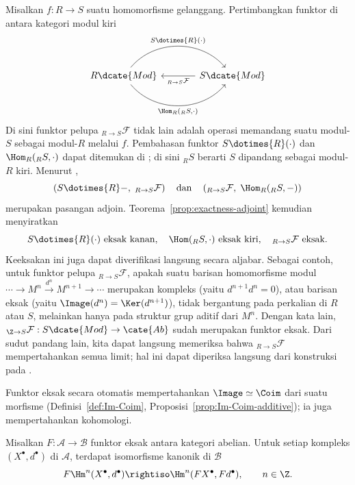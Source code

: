\begin{contoh}\label{eg:module-adjoint-pairs}
Misalkan $f:R\to S$ suatu homomorfisme gelanggang. Pertimbangkan funktor di
antara kategori modul kiri
\[\begin{tikzcd}[column sep=large]
	R\dcate{Mod} \arrow[bend left=50, r, "{S \dotimes{R} (\cdot)}"] \arrow[bend right=50, r, "{\Hom_R({}_R S, \cdot)}"'] & S\dcate{Mod} \arrow[l, "{ {}_{R \to S} \mathcal{F} }"]
\end{tikzcd}\]
Di sini funktor pelupa ${}_{R\to S}\mathcal{F}$ tidak lain adalah operasi
memandang suatu modul-$S$ sebagai modul-$R$ melalui $f$. Pembahasan funktor
$S\dotimes{R}(\cdot)$ dan $\Hom_R({}_R S,\cdot)$ dapat ditemukan di
\cite[\S 6.6]{Li1}; di sini ${}_R S$ berarti $S$ dipandang sebagai modul-$R$ kiri.
Menurut \cite[Korolari 6.6.8]{Li1},
\[\left(S\dotimes{R}-,\;{}_{R\to S}\mathcal{F}\right)
\quad\text{dan}\quad
\left({}_{R\to S}\mathcal{F},\;\Hom_R({}_R S,-)\right)\]
merupakan pasangan adjoin. Teorema~\ref{prop:exactness-adjoint} kemudian menyiratkan
\[S\dotimes{R}(\cdot)\ \text{eksak kanan},\quad
\Hom({}_R S,\cdot)\ \text{eksak kiri},\quad
{}_{R\to S}\mathcal{F}\ \text{eksak}.\]
Keeksakan ini juga dapat diverifikasi langsung secara aljabar. Sebagai contoh,
untuk funktor pelupa ${}_{R\to S}\mathcal{F}$, apakah suatu barisan homomorfisme
modul $\cdots\to M^n\xrightarrow{d^n}M^{n+1}\to\cdots$ merupakan kompleks
(yaitu $d^{n+1}d^n=0$), atau barisan eksak (yaitu
$\Image(d^n)=\Ker(d^{n+1})$), tidak bergantung pada perkalian di $R$ atau $S$,
melainkan hanya pada struktur grup aditif dari $M^n$. Dengan kata lain,
${}_{\Z\to S}\mathcal{F}:S\dcate{Mod}\to\cate{Ab}$ sudah merupakan funktor eksak.
Dari sudut pandang lain, kita dapat langsung memeriksa bahwa
${}_{R\to S}\mathcal{F}$ mempertahankan semua limit; hal ini dapat diperiksa langsung
dari konstruksi pada \cite[Teorema 6.2.2]{Li1}.
\end{contoh}
Funktor eksak secara otomatis mempertahankan $\Image\simeq\Coim$ dari suatu
morfisme (Definisi~\ref{def:Im-Coim}, Proposisi~\ref{prop:Im-Coim-additive});
ia juga mempertahankan kohomologi.

\begin{proposisi}\label{prop:exact-preserves-cohomologies}
Misalkan $F:\mathcal{A}\to\mathcal{B}$ funktor eksak antara kategori abelian.
Untuk setiap kompleks $(X^\bullet,d^\bullet)$ di $\mathcal{A}$, terdapat
isomorfisme kanonik di $\mathcal{B}$
\[F\Hm^n(X^\bullet,d^\bullet)\rightiso
\Hm^n(FX^\bullet,Fd^\bullet),\qquad n\in\Z.\]
\end{proposisi}

